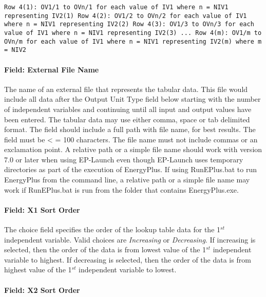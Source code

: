 \begin{lstlisting}
Row 4(1): OV1/1 to OVn/1 for each value of IV1 where n = NIV1 representing IV2(1) Row 4(2): OV1/2 to OVn/2 for each value of IV1 where n = NIV1 representing IV2(2) Row 4(3): OV1/3 to OVn/3 for each value of IV1 where n = NIV1 representing IV2(3) ... Row 4(m): OV1/m to OVn/m for each value of IV1 where n = NIV1 representing IV2(m) where m = NIV2
\end{lstlisting}

\paragraph{Field: External File Name}\label{field-external-file-name}

The name of an external file that represents the tabular data. This file would include all data after the Output Unit Type field below starting with the number of independent variables and continuing until all input and output values have been entered. The tabular data may use either comma, space or tab delimited format. The field should include a full path with file name, for best results. The field must be \textless{} = 100 characters. The file name must not include commas or an exclamation point. A relative path or a simple file name should work with version 7.0 or later when using EP-Launch even though EP-Launch uses temporary directories as part of the execution of EnergyPlus. If using RunEPlus.bat to run EnergyPlus from the command line, a relative path or a simple file name may work if RunEPlus.bat is run from the folder that contains EnergyPlus.exe.

\paragraph{Field: X1 Sort Order}\label{field-x1-sort-order}

The choice field specifies the order of the lookup table data for the 1\(^{st}\) independent variable. Valid choices are \emph{Increasing} or \emph{Decreasing}. If increasing is selected, then the order of the data is from lowest value of the 1\(^{st}\) independent variable to highest. If decreasing is selected, then the order of the data is from highest value of the 1\(^{st}\) independent variable to lowest.

\paragraph{Field: X2 Sort Order}\label{field-x2-sort-order}

